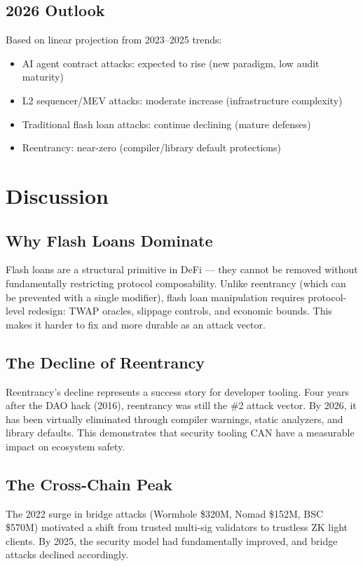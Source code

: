 \documentclass[10pt,conference]{IEEEtran}
\begin{document}
\subsection{2026 Outlook}

Based on linear projection from 2023–2025 trends:
\begin{itemize}
  \item AI agent contract attacks: expected to rise (new paradigm, low audit maturity)
  \item L2 sequencer/MEV attacks: moderate increase (infrastructure complexity)
  \item Traditional flash loan attacks: continue declining (mature defenses)
  \item Reentrancy: near-zero (compiler/library default protections)
\end{itemize}

\section{Discussion}

\subsection{Why Flash Loans Dominate}
Flash loans are a structural primitive in DeFi — they cannot be removed without fundamentally restricting protocol composability. Unlike reentrancy (which can be prevented with a single modifier), flash loan manipulation requires protocol-level redesign: TWAP oracles, slippage controls, and economic bounds. This makes it harder to fix and more durable as an attack vector.

\subsection{The Decline of Reentrancy}
Reentrancy's decline represents a success story for developer tooling. Four years after the DAO hack (2016), reentrancy was still the \#2 attack vector. By 2026, it has been virtually eliminated through compiler warnings, static analyzers, and library defaults. This demonstrates that security tooling CAN have a measurable impact on ecosystem safety.

\subsection{The Cross-Chain Peak}
The 2022 surge in bridge attacks (Wormhole \$320M, Nomad \$152M, BSC \$570M) motivated a shift from trusted multi-sig validators to trustless ZK light clients. By 2025, the security model had fundamentally improved, and bridge attacks declined accordingly.
\end{document}
